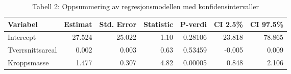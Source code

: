 \documentclass[
]{article}
\newenvironment{Shaded}{\begin{snugshade}}{\end{snugshade}}
\newcommand{\NormalTok}[1]{#1}
\begin{document}
\begin{Shaded}
\begin{Highlighting}[]
{{{{\NormalTok{tabell2}
\end{Highlighting}
\end{Shaded}

\begin{table}

\caption{\label{tab:unnamed-chunk-1}Tabell 2: Oppsummering av regresjonsmodellen med konfidensintervaller }
\centering
\begin{tabular}[t]{l|r|r|r|r|r|r}
\hline
Variabel & Estimat & Std. Error & Statistic & P-verdi & CI 2.5\% & CI 97.5\%\\
\hline
Intercept & 27.524 & 25.022 & 1.10 & 0.28106 & -23.818 & 78.865\\
\hline
Tverrsnittsareal & 0.002 & 0.003 & 0.63 & 0.53459 & -0.005 & 0.009\\
\hline
Kroppsmasse & 1.477 & 0.307 & 4.82 & 0.00005 & 0.848 & 2.106\\
\hline
\end{tabular}
\end{table}
\end{document}
